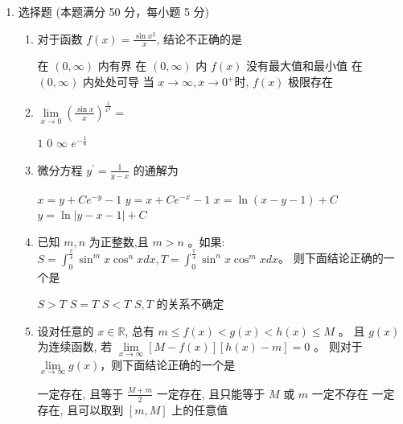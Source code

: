 

\begin{enumerate}
	\item
	选择题 (本题满分 50 分，每小题 5 分)
	\begin{enumerate}
		\item
		对于函数 $f(x)=\frac{\sin x^{2}}{x}$, 结论不正确的是 


\fourchoices
{在 $(0, \infty)$ 内有界}
{在 $(0, \infty)$ 内 $f(x)$ 没有最大值和最小值}
{在 $(0, \infty)$ 内处处可导}
{当 $x \rightarrow \infty, x \rightarrow 0^{+}$时, $f(x)$ 极限存在}

\item
$ \lim\limits _{x \rightarrow 0}\left(\frac{\sin x}{x}\right)^{\frac{1}{x^{2}}}= $ 

\fourchoices
{$ 1 $}
{$ 0 $}
{$\infty$}
{$e^{-\frac{1}{6}}$}

\item
微分方程 $y^{\prime}=\frac{1}{y-x}$ 的通解为 


\fourchoices
{$x=y+C e^{-y}-1$}
{$y=x+C e^{-x}-1$}
{$x=\ln (x-y-1)+C$}
{$y=\ln |y-x-1|+C$}

\item
已知 $m, n$ 为正整数,且 $m>n$ 。如果: $S=\int_{0}^{\frac{\pi}{4}} \sin ^{m} x \cos ^{n} x d x, T=\int_{0}^{\frac{\pi}{4}} \sin ^{n} x \cos ^{m} x d x$。 则下面结论正确的一个是 


\fourchoices
{$S>T$}
{$S=T$}
{$S<T$}
{$S, T$ 的关系不确定}

\item
设对任意的 $x \in \mathbb{R}$, 总有 $m \leqslant f(x)<g(x)<h(x) \leqslant M$ 。 且 $g(x)$ 为连续函数, 若 $\lim\limits _{x \rightarrow \infty}[M-f(x)][h(x)-m]=0$ 。 则对于 $\lim\limits _{x \rightarrow \infty}g(x)$，则下面结论正确的一个是 


\fourchoices
{一定存在, 且等于 $\frac{M+m}{2}$}
{一定存在, 且只能等于 $M$ 或 $m$}
{一定不存在}
{一定存在, 且可以取到 $[m, M]$ 上的任意值}



\end{enumerate}
\end{enumerate}
